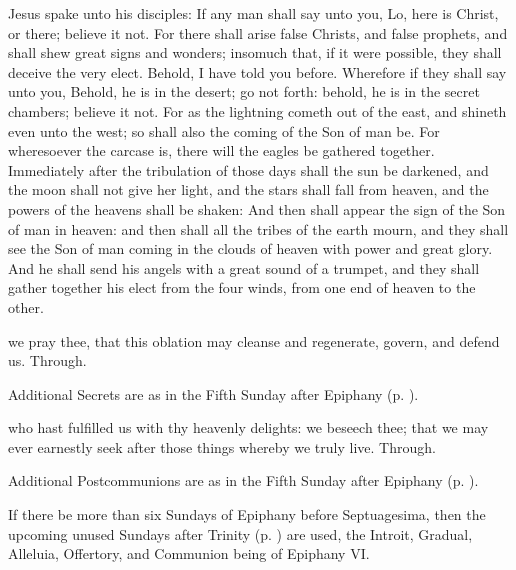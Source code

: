  Jesus spake unto his disciples: If any man shall say unto you, Lo, here is Christ, or there; believe it not. For there shall arise false Christs, and false prophets, and shall shew great signs and wonders; insomuch that, if it were possible, they shall deceive the very elect. Behold, I have told you before. Wherefore if they shall say unto you, Behold, he is in the desert; go not forth: behold, he is in the secret chambers; believe it not. For as the lightning cometh out of the east, and shineth even unto the west; so shall also the coming of the Son of man be. For wheresoever the carcase is, there will the eagles be gathered together. Immediately after the tribulation of those days shall the sun be darkened, and the moon shall not give her light, and the stars shall fall from heaven, and the powers of the heavens shall be shaken: And then shall appear the sign of the Son of man in heaven: and then shall all the tribes of the earth mourn, and they shall see the Son of man coming in the clouds of heaven with power and great glory. And he shall send his angels with a great sound of a trumpet, and they shall gather together his elect from the four winds, from one end of heaven to the other.

\secret
{} we pray thee, that this oblation may cleanse and regenerate, govern, and defend us. Through.
\begin{rubric}
    Additional Secrets are as in the Fifth Sunday after Epiphany (p. \pageref{EpiphanyVSecret}).
\end{rubric}
\postcommunion
{} who hast fulfilled us with thy heavenly delights: we beseech thee; that we may ever earnestly seek after those things whereby we truly live. Through.
\begin{rubric}
    Additional Postcommunions are as in the Fifth Sunday after Epiphany (p. \pageref{EpiphanyVPostcommunion}).
\end{rubric}
\begin{rubric}
    If there be more than six Sundays of Epiphany before Septuagesima, then the upcoming unused Sundays after Trinity (p. \pageref{trinity}) are used, the Introit, Gradual, Alleluia, Offertory, and Communion being of Epiphany VI.
\end{rubric}

